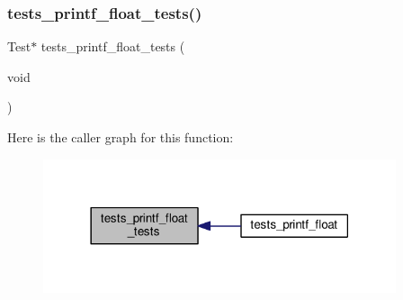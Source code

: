\subsubsection{\texorpdfstring{tests\+\_\+printf\+\_\+float\+\_\+tests()}{tests\_printf\_float\_tests()}}
{\footnotesize\ttfamily Test$\ast$ tests\+\_\+printf\+\_\+float\+\_\+tests (\begin{DoxyParamCaption}\item[{void}]{ }\end{DoxyParamCaption})}

Here is the caller graph for this function\+:
\nopagebreak
\begin{figure}[H]
\begin{center}
\leavevmode
\includegraphics[width=294pt]{tests-printf__float_8c_aa64c21be015c861a67a3a93aba74160f_icgraph}
\end{center}
\end{figure}
